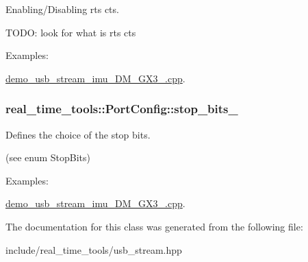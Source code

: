 Enabling/\+Disabling rts cts. 

T\+O\+DO\+: look for what is rts cts \begin{Desc}
\item[Examples\+: ]\par
\hyperlink{demo_usb_stream_imu_3DM_GX3_25_8cpp-example}{demo\+\_\+usb\+\_\+stream\+\_\+imu\+\_\+D\+M\+\_\+\+G\+X3\+\_.\+cpp}.\end{Desc}
\subsubsection[{\texorpdfstring{stop\+\_\+bits\+\_\+}{stop_bits_}}]{ real\+\_\+time\+\_\+tools\+::\+Port\+Config\+::stop\+\_\+bits\+\_\+}\hypertarget{classreal__time__tools_1_1PortConfig_a3303d793237edbfa0b3c28f3f01c3837}{}\label{classreal__time__tools_1_1PortConfig_a3303d793237edbfa0b3c28f3f01c3837}


Defines the choice of the stop bits. 

(see enum Stop\+Bits) \begin{Desc}
\item[Examples\+: ]\par
\hyperlink{demo_usb_stream_imu_3DM_GX3_25_8cpp-example}{demo\+\_\+usb\+\_\+stream\+\_\+imu\+\_\+D\+M\+\_\+\+G\+X3\+\_.\+cpp}.\end{Desc}


The documentation for this class was generated from the following file\+:\begin{DoxyCompactItemize}
\item 
include/real\+\_\+time\+\_\+tools/usb\+\_\+stream.\+hpp\end{DoxyCompactItemize}

